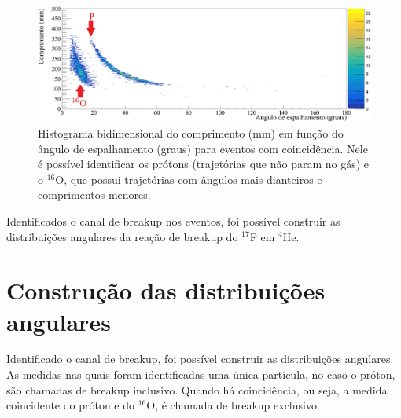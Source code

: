 \documentclass[a4paper,12pt,oneside]{book}
\begin{document}

\begin{figure}[H]
    \centering
    \includegraphics[scale = 1., width=\columnwidth]{figs/comp_vs_ang_n2_coinc_cut12.png}
    \caption{Histograma bidimensional do comprimento (mm) em função do ângulo de espalhamento (graus) para eventos com coincidência. Nele é possível identificar os prótons (trajetórias que não param no gás) e o $^{16}$O, que possui trajetórias com ângulos mais dianteiros e comprimentos menores.}
    \label{fig:comp_vs_ang_coinc}
\end{figure}

\par Identificados o canal de breakup nos eventos, foi possível construir as distribuições angulares da reação de breakup do $^{17}$F em $^4$He.

\section{Construção das distribuições angulares}\label{sec:sec_choque}

\par Identificado o canal de breakup, foi possível construir as distribuições angulares. As medidas nas quais foram identificadas uma única partícula, no caso o próton, são chamadas de breakup inclusivo. Quando há coincidência, ou seja, a medida coincidente do próton e do $^{16}$O, é chamada de breakup exclusivo.

\end{document}
